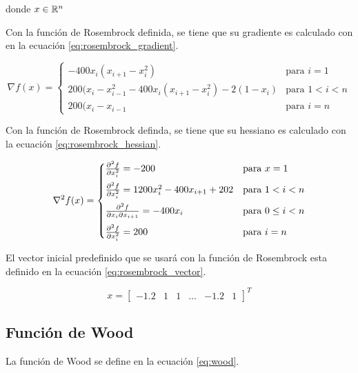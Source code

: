 donde $x\in \mathbb{R}^n$

Con la función de Rosembrock definida, se tiene que su gradiente es calculado con en la ecuación \ref{eq:rosembrock_gradient}.

\begin{equation}
    \nabla f (x) =\begin{cases}
        -400x_i(x_{i+1}-x_{i}^2)                              & \text{para } i=1   \\[0.25cm]
        200(x_{i}-x_{i-1}^2-400x_i(x_{i+1}-x_{i}^2) -2(1-x_i) & \text{para } 1<i<n \\[0.25cm]
        200(x_{i}-x_{i-1}                                     & \text{para } i=n
    \end{cases} \label{eq:rosembrock_gradient}
\end{equation}

Con la función de Rosembrock definda, se tiene que su hessiano es calculado con la ecuación \ref{eq:rosembrock_hessian}.

\begin{equation}
    \nabla^2 f(x)  = \begin{cases}
        \frac{\partial^2 f}{\partial x_i^2} = -200                    & \text{para } x=1         \\[0.25cm]
        \frac{\partial^2 f}{\partial x_i^2} =1200x_i^2-400x_{i+1}+202 & \text{para } 1<i<n       \\[0.25cm]
        \frac{\partial^2 f}{\partial x_i \partial x_{i+1}}  = -400x_i       & \text{para } 0\leq i < n \\[0.25cm]
        \frac{\partial^2 f}{\partial x_i^2} = 200                     & \text{para } i=n
    \end{cases}
    \label{eq:rosembrock_hessian}
\end{equation}

El vector inicial predefinido que se usará con la función de Rosembrock esta definido en la ecuación \ref{eq:rosembrock_vector}.

\begin{equation}
    x=\begin{bmatrix}
        -1.2 & 1 & 1 & \dots & -1.2 & 1
    \end{bmatrix}^T \label{eq:rosembrock_vector}
\end{equation}

\subsection{Función de Wood}

La función de Wood se define en la ecuación \ref{eq:wood}.

